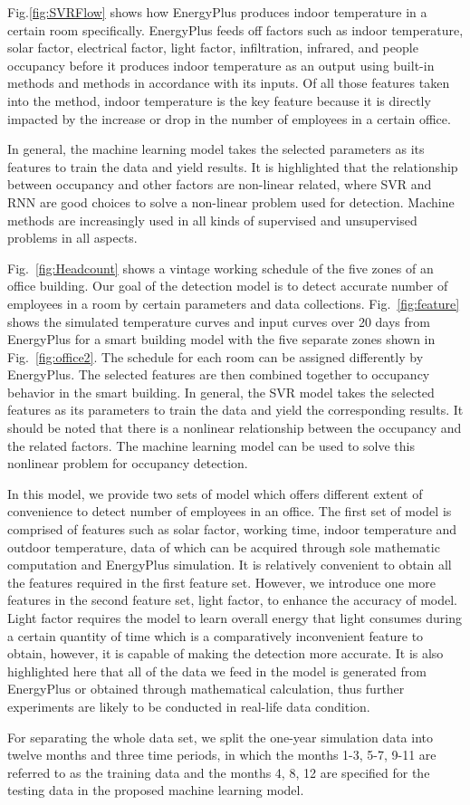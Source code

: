 Fig.\ref{fig:SVRFlow} shows how EnergyPlus produces indoor temperature
in a certain room specifically. EnergyPlus feeds off factors such as
indoor temperature, solar factor, electrical factor, light factor,
infiltration, infrared, and people occupancy before it produces indoor
temperature as an output using built-in methods and methods in
accordance with its inputs. Of all those features taken into the
method, indoor temperature is the key feature because it is directly
impacted by the increase or drop in the number of employees in a
certain office.

In general, the machine learning model takes the selected parameters
as its features to train the data and yield results. It is highlighted
that the relationship between occupancy and other factors are
non-linear related, where SVR and RNN are good choices to
solve a non-linear problem used for detection. Machine methods are
increasingly used in all kinds of supervised and unsupervised problems
in all aspects.

Fig.~\ref{fig:Headcount} shows a vintage working schedule of the five
zones of an office building. Our goal of the detection model is to
detect accurate number of employees in a room by certain parameters
and data collections. Fig.~\ref{fig:feature} shows the simulated
temperature curves and input curves over 20 days from EnergyPlus for a
smart building model with the five separate zones shown in
Fig.~\ref{fig:office2}. The schedule for each room can be assigned
differently by EnergyPlus. The selected features are then combined
together to occupancy behavior in the smart building. In general, the
SVR model takes the selected features as its parameters to train the
data and yield the corresponding results. It should be noted that
there is a nonlinear relationship between the occupancy and the
related factors. The machine learning model can be used to solve this
nonlinear problem for occupancy detection.

In this model, we provide two sets of model which offers different
extent of convenience to detect number of employees in an office. The
first set of model is comprised of features such as solar factor,
working time, indoor temperature and outdoor temperature, data of
which can be acquired through sole mathematic computation and
EnergyPlus simulation. It is relatively convenient to obtain all the
features required in the first feature set. However, we introduce one
more features in the second feature set, light factor, to enhance the
accuracy of model. Light factor requires the model to learn overall
energy that light consumes during a certain quantity of time which is
a comparatively inconvenient feature to obtain, however, it is capable
of making the detection more accurate. It is also highlighted here
that all of the data we feed in the model is generated from EnergyPlus
or obtained through mathematical calculation, thus further experiments
are likely to be conducted in real-life data condition.

For separating the whole data set, we split the one-year simulation
data into twelve months and three time periods, in which the months
1-3, 5-7, 9-11 are referred to as the training data and the months 4,
8, 12 are specified for the testing data in the proposed machine
learning model.
